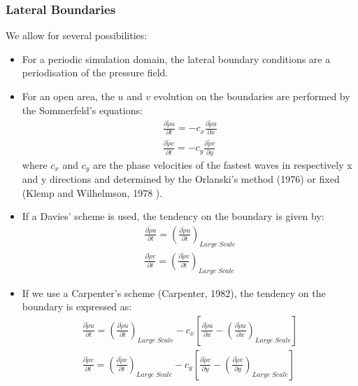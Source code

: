 \subsubsection{Lateral Boundaries}
We allow for several possibilities:
\begin{itemize}

\item For a periodic simulation domain, the lateral boundary conditions are
a periodisation of the pressure field.
\item For an open area, the ${ u }$ and ${ v }$ evolution on the boundaries
are performed by the Sommerfeld's equations:
\begin{eqnarray}
\label{som1}
\frac {\partial{\tilde{\rho} { u }} } {\partial{t} } = -  c_x \frac
{\partial{\tilde{\rho} { u }} } {\partial{x} } \\
\label{som2}
\frac {\partial{\tilde{\rho} { v }} } {\partial{t} } = -  c_y \frac
{\partial{\tilde{\rho} { v }} } {\partial{y} }
\end{eqnarray}
where $c_x$ and $c_y$ are the phase velocities
of the fastest waves in  respectively x and y directions and determined by the
Orlanski's method (1976\nocite {orl76}) or fixed (Klemp and Wilhelmson, 1978
\nocite{kle78}). \\
\item If a Davies' scheme is used, the tendency on the boundary is given by:\\
\begin{eqnarray}
\frac {\partial{\tilde{\rho} { u }} } {\partial{t} } =
\left( \frac {\partial{\tilde{\rho} { u }} } {\partial{t} } \right)_{Large
\; Scale} \\
\frac {\partial{\tilde{\rho} { v }} } {\partial{t} } =
\left( \frac {\partial{\tilde{\rho} { v }} } {\partial{t} } \right)_{Large
\; Scale}
\end{eqnarray}
\item If we use a Carpenter's scheme (Carpenter, 1982\nocite{car82}),
the tendency on the boundary is expressed as:
\begin{eqnarray}
\frac {\partial{\tilde{\rho} { u }} } {\partial{t} } =
\left( \frac {\partial{\tilde{\rho} { u }} } {\partial{t} } \right)_{Large
\; Scale}-  c_x  \left[
 \frac {\partial{\tilde{\rho} { u }} } {\partial{x} }
- \left( \frac {\partial{\tilde{\rho} { u }} } {\partial{x} }\right)_{Large
\; Scale}
\right]\\
%
\frac {\partial{\tilde{\rho} { v }} } {\partial{t} } =
\left( \frac {\partial{\tilde{\rho} { v }} } {\partial{t} } \right)_{Large
\; Scale} -  c_y \left[
 \frac {\partial{\tilde{\rho} { v }} } {\partial{y} }
- \left( \frac {\partial{\tilde{\rho} { v }} } {\partial{y} }\right)_{Large
\; Scale}
\right]
\end{eqnarray}
\end{itemize}

